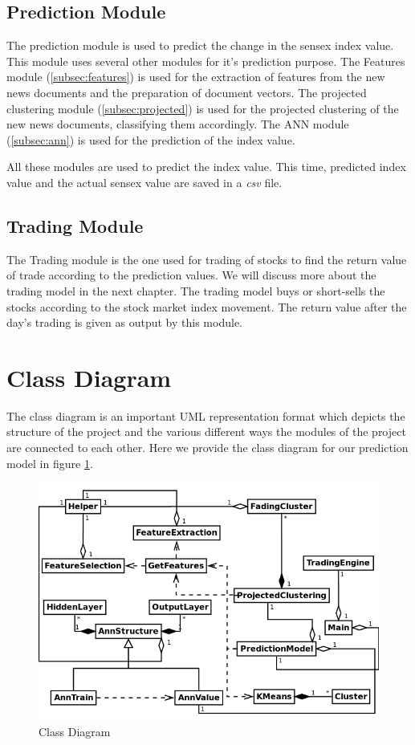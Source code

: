 \documentclass[a4paper,12bp]{report}
\begin{document}
\subsection{Prediction Module}
The prediction module is used to predict the change in the sensex index value. This module uses several other modules for it's prediction purpose. The Features module (\ref{subsec:features}) is used for the extraction of features from the new news documents and the preparation of document vectors. The projected clustering module (\ref{subsec:projected}) is used for the projected clustering of the new news documents, classifying them accordingly. The ANN module (\ref{subsec:ann}) is used for the prediction of the index value. 

All these modules are used to predict the index value. This time, predicted index value and the actual sensex value are saved in a \textit{csv} file. 

\subsection{Trading Module}
The Trading module is the one used for trading of stocks to find the return value of trade according to the prediction values. We will discuss more about the trading model in the next chapter. The trading model buys or short-sells the stocks according to the stock market index movement. The return value after the day's trading is given as output by this module. 

\section{Class Diagram}

The class diagram is an important UML representation format which depicts the structure of the project and the various different ways the modules of the project are connected to each other. Here we provide the class diagram for our prediction model in figure \ref{fig:class_diag}. 

\begin{figure}[htbp]
\centering
\includegraphics[scale = 0.5]{pictures/projectClass.png}
\caption{Class Diagram}
\label{fig:class_diag}
\end{figure}
\end{document}
